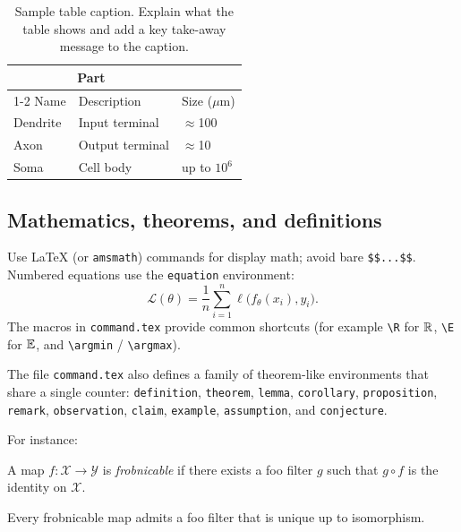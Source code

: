 \documentclass[11pt,letterpaper,twocolumn]{template/style}
\begin{document}
\begin{table}[t]
  \caption{Sample table caption. Explain what the table shows and add a key
  take-away message to the caption.}
  \label{tab:sample}
  \centering
  \begin{tabular}{lll}
    \toprule
    \multicolumn{2}{c}{Part} \\
    \cmidrule(r){1-2}
    Name     & Description     & Size ($\mu$m) \\
    \midrule
    Dendrite & Input terminal  & $\approx$100  \\
    Axon     & Output terminal & $\approx$10   \\
    Soma     & Cell body       & up to $10^6$  \\
    \bottomrule
  \end{tabular}
\end{table}

\subsection{Mathematics, theorems, and definitions}
\label{sec:math}

Use \LaTeX{} (or \verb+amsmath+) commands for display math; avoid bare
\verb+$$...$$+. Numbered equations use the \verb+equation+ environment:
\begin{equation}
  \label{eq:sample}
  \mathcal{L}(\theta)
  = \frac{1}{n}\sum_{i=1}^{n} \ell\!\big(f_\theta(x_i), y_i\big).
\end{equation}
The macros in \verb+command.tex+ provide common shortcuts (for example
\verb+\R+ for $\mathbb{R}$, \verb+\E+ for $\mathbb{E}$, and \verb+\argmin+ / \verb+\argmax+).

{\raggedright
The file \verb+command.tex+ also defines a family of theorem-like environments
that share a single counter: \verb+definition+, \verb+theorem+, \verb+lemma+,
\verb+corollary+, \verb+proposition+, \verb+remark+, \verb+observation+,
\verb+claim+, \verb+example+, \verb+assumption+, and \verb+conjecture+.
\par}
For instance:

\begin{definition}[Frobnication]
\label{def:frob}
A map $f:\mathcal{X}\to\mathcal{Y}$ is \emph{frobnicable} if there exists a foo
filter $g$ such that $g\circ f$ is the identity on $\mathcal{X}$.
\end{definition}

\begin{theorem}
\label{thm:frob}
Every frobnicable map admits a foo filter that is unique up to isomorphism.
\end{theorem}
\end{document}

